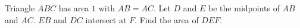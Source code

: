 Triangle $ABC$ has area $1$ with $AB=AC$. Let $D$ and $E$ be the midpoints of $AB$ and $AC$. $EB$ and $DC$ intersect at $F$. Find the area of $DEF$.
